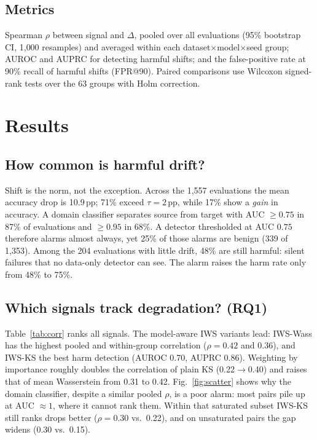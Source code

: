 \documentclass[conference]{IEEEtran}
\theoremstyle{plainhead}
\newcommand{\iws}{\textsc{IWS}}
\newcommand{\pp}{\,pp}
\begin{document}
\subsection{Metrics}
Spearman $\rho$ between signal and $\Delta$, pooled over all evaluations (95\% bootstrap CI, 1{,}000 resamples) and averaged within each dataset$\times$model$\times$seed group; AUROC and AUPRC for detecting harmful shifts; and the false-positive rate at 90\% recall of harmful shifts (FPR@90). Paired comparisons use Wilcoxon signed-rank tests over the 63 groups with Holm correction.

\section{Results}
\subsection{How common is harmful drift?}
Shift is the norm, not the exception. Across the 1{,}557 evaluations the mean accuracy drop is 10.9\pp; 71\% exceed $\tau=2$\pp, while 17\% show a \emph{gain} in accuracy. A domain classifier separates source from target with AUC $\ge0.75$ in 87\% of evaluations and $\ge0.95$ in 68\%. A detector thresholded at AUC $0.75$ therefore alarms almost always, yet 25\% of those alarms are benign (339 of 1{,}353). Among the 204 evaluations with little drift, 48\% are still harmful: silent failures that no data-only detector can see. The alarm raises the harm rate only from 48\% to 75\%.

\subsection{Which signals track degradation? (RQ1)}
Table~\ref{tab:corr} ranks all signals. The model-aware \iws{} variants lead: \iws{}-Wass has the highest pooled and within-group correlation ($\rho=0.42$ and $0.36$), and \iws{}-KS the best harm detection (AUROC 0.70, AUPRC 0.86). Weighting by importance roughly doubles the correlation of plain KS (0.22$\to$0.40) and raises that of mean Wasserstein from 0.31 to 0.42. Fig.~\ref{fig:scatter} shows why the domain classifier, despite a similar pooled $\rho$, is a poor alarm: most pairs pile up at AUC $\approx1$, where it cannot rank them. Within that saturated subset \iws{}-KS still ranks drops better ($\rho=0.30$ vs.\ 0.22), and on unsaturated pairs the gap widens (0.30 vs.\ 0.15).
\end{document}
